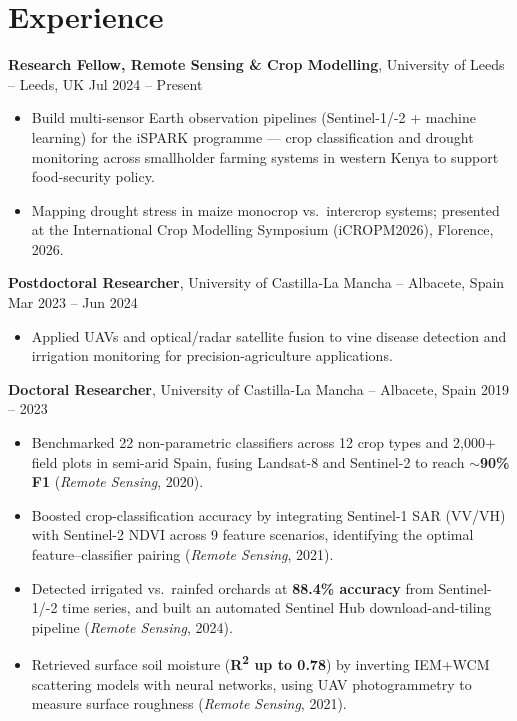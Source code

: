 \documentclass[10pt, a4paper]{article}
\newenvironment{highlights}{
    \begin{itemize}[
        topsep=0.05cm,
        parsep=0.05cm,
        partopsep=0pt,
        itemsep=0pt,
        leftmargin=10pt
    ]
}{
    \end{itemize}
}
\begin{document}
\section{Experience}

\textbf{Research Fellow, Remote Sensing \& Crop Modelling}, University of Leeds -- Leeds, UK \hfill Jul 2024 -- Present
\vspace{0.05cm}
\begin{highlights}
    \item Build multi-sensor Earth observation pipelines (Sentinel-1/-2 + machine learning) for the iSPARK programme — crop classification and drought monitoring across smallholder farming systems in western Kenya to support food-security policy.
    \item Mapping drought stress in maize monocrop vs.\ intercrop systems; presented at the International Crop Modelling Symposium (iCROPM2026), Florence, 2026.
\end{highlights}

\vspace{0.15cm}

\textbf{Postdoctoral Researcher}, University of Castilla-La Mancha -- Albacete, Spain \hfill Mar 2023 -- Jun 2024
\vspace{0.05cm}
\begin{highlights}
    \item Applied UAVs and optical/radar satellite fusion to vine disease detection and irrigation monitoring for precision-agriculture applications.
\end{highlights}

\vspace{0.15cm}

\textbf{Doctoral Researcher}, University of Castilla-La Mancha -- Albacete, Spain \hfill 2019 -- 2023
\vspace{0.05cm}
\begin{highlights}
    \item Benchmarked 22 non-parametric classifiers across 12 crop types and 2{,}000+ field plots in semi-arid Spain, fusing Landsat-8 and Sentinel-2 to reach \textbf{$\sim$90\% F1} (\emph{Remote Sensing}, 2020).
    \item Boosted crop-classification accuracy by integrating Sentinel-1 SAR (VV/VH) with Sentinel-2 NDVI across 9 feature scenarios, identifying the optimal feature--classifier pairing (\emph{Remote Sensing}, 2021).
    \item Detected irrigated vs.\ rainfed orchards at \textbf{88.4\% accuracy} from Sentinel-1/-2 time series, and built an automated Sentinel Hub download-and-tiling pipeline (\emph{Remote Sensing}, 2024).
    \item Retrieved surface soil moisture (\textbf{R\textsuperscript{2} up to 0.78}) by inverting IEM+WCM scattering models with neural networks, using UAV photogrammetry to measure surface roughness (\emph{Remote Sensing}, 2021).
\end{highlights}
\end{document}
